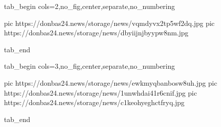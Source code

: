  
 
 
 
 

\ifcmt
  tab_begin cols=2,no_fig,center,separate,no_numbering

     pic https://donbas24.news/storage/news/vqmdyvx2tp5wf2dq.jpg
		 pic https://donbas24.news/storage/news/dbyiijnjbyypw8nm.jpg

  tab_end
\fi


\ifcmt
  tab_begin cols=3,no_fig,center,separate,no_numbering

     pic https://donbas24.news/storage/news/ewkmyqbanbosw8uh.jpg
		 pic https://donbas24.news/storage/news/1unwhdai41r6cnif.jpg
		 pic https://donbas24.news/storage/news/c1keohyeghctfryq.jpg

  tab_end
\fi
